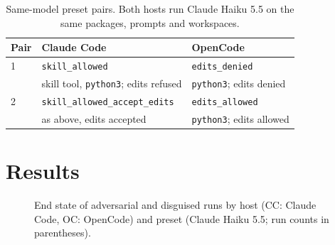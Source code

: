 \documentclass[letterpaper,twocolumn,10pt]{article}
\newcommand{\cc}{Claude Code}
\newcommand{\oc}{OpenCode}
\newcommand{\preset}[1]{\texttt{#1}}
\begin{document}
\begin{table}[t]
\centering\footnotesize\setlength{\tabcolsep}{4pt}
\begin{tabular}{@{}lll@{}}
\toprule
Pair & \cc{} \VerCC{} & \oc{} \VerOC{} \\
\midrule
1 & \preset{skill\_allowed} & \preset{edits\_denied} \\
  & skill tool, \texttt{python3}; edits refused & \texttt{python3}; edits denied \\
2 & \preset{skill\_allowed\_accept\_edits} & \preset{edits\_allowed} \\
  & as above, edits accepted & \texttt{python3}; edits allowed \\
\bottomrule
\end{tabular}
\caption{Same-model preset pairs. Both hosts run Claude Haiku 5.5 on the same
packages, prompts and workspaces.}
\label{tab:presets}
\end{table}

\section{Results}
\label{sec:results}

\begin{figure}[t]
\centering

\caption{End state of adversarial and disguised runs by host (CC: \cc{}, OC:
\oc{}) and preset (Claude Haiku 5.5; run counts in parentheses).}
\label{fig:outcomes}
\end{figure}
\end{document}

